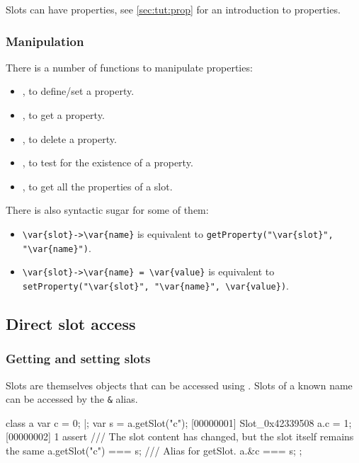 Slots can have properties, see \autoref{sec:tut:prop} for an introduction to
properties.

\subsubsection{Manipulation}

There is a number of functions to manipulate properties:
\begin{itemize}
\item {}, to define/set a property.
\item {}, to get a property.
\item {}, to delete a property.
\item {}, to test for the existence of a
  property.
\item {}, to get all the properties of a slot.
\end{itemize}

There is also syntactic sugar for some of them:

\begin{itemize}
\item \lstinline|\var{slot}->\var{name}| is equivalent to
  \lstinline[style=varInString]|getProperty("\var{slot}", "\var{name}")|.
\item \lstinline|\var{slot}->\var{name} = \var{value}| is equivalent to
  \lstinline[style=varInString]|setProperty("\var{slot}", "\var{name}", \var{value})|.
\end{itemize}


\subsection{Direct slot access}

\subsubsection{Getting and setting slots}

Slots are themselves objects that can be accessed using
. Slots of a known name can be accessed by the
\lstinline|&| alias.

\begin{urbiscript}
class a {
  var c = 0;
}|;
var s = a.getSlot("c");
[00000001] Slot_0x42339508
a.c = 1;
[00000002] 1
assert
{
  /// The slot content has changed, but the slot itself remains the same
  a.getSlot("c") === s;
  /// Alias for getSlot.
  a.&c === s;
};
\end{urbiscript}

